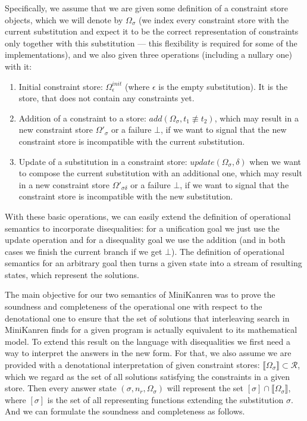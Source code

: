 \documentclass[submission,copyright,creativecommons]{eptcs}
\newcommand{\sembr}[1]{\llbracket{#1}\rrbracket}
\newcommand{\diseq}{\not\equiv}
\newcommand{\reprfunset}{\mathcal{R}}
\newcommand{\cstore}{\Omega}
\newcommand{\cstoreinit}{\cstore_\epsilon^{init}}
\newcommand{\csadd}[3]{add(#1, #2 \diseq #3)}  %
\newcommand{\csupdate}[2]{update(#1, #2)}  %
\begin{document}
Specifically, we assume that we are given some definition of a constraint store objects, which we will denote by $\cstore_\sigma$ (we index every constraint store with the current substitution and expect it to be the correct representation of constraints only together with this substitution --- this flexibility is required for some of the implementations), and we also given three operations (including a nullary one) with it:

\begin{enumerate}
\item Initial constraint store: $\cstoreinit$ (where $\epsilon$ is the empty substitution). It is the store, that does not contain any constraints yet.
\item Addition of a constraint to a store: $\csadd{\cstore_\sigma}{t_1}{t_2}$, which may result in a new constraint store $\cstore'_\sigma$ or a failure $\bot$, if we want to signal that the new constraint store is incompatible with the current substitution.
\item Update of a substitution in a constraint store: $\csupdate{\cstore_\sigma}{\delta}$ when we want to compose the current substitution with an additional one, which may result in a new constraint store $\cstore'_{\sigma \delta}$ or a failure $\bot$, if we want to signal that the constraint store is incompatible with the new substitution.
\end{enumerate}

With these basic operations, we can easily extend the definition of operational semantics to incorporate disequalities: for a unification goal we just use the update operation and for a disequality goal we use the addition (and in both cases we finish the current branch if we get $\bot$). The definition of operational semantics for an arbitrary goal then turns a given state into a stream of resulting states, which represent the solutions.

The main objective for our two semantics of MiniKanren was to prove the soundness and completeness of the operational one with respect to the denotational one to ensure that the set of solutions that interleaving search in MiniKanren finds for a given program is actually equivalent to its mathematical model. To extend this result on the language with disequalities we first need a way to interpret the answers in the new form. For that, we also assume we are provided with a denotational interpretation of given constraint stores: $\sembr{\cstore_\sigma} \subset \reprfunset$, which we regard as the set of all solutions satisfying the constraints in a given store. Then every answer state $(\sigma, n_r, \cstore_\sigma)$ will represent the set $[\sigma] \cap \sembr{\cstore_\sigma}$, where $[\sigma]$ is the set of all representing functions extending the substitution $\sigma$. And we can formulate the soundness and completeness as follows.
\end{document}
